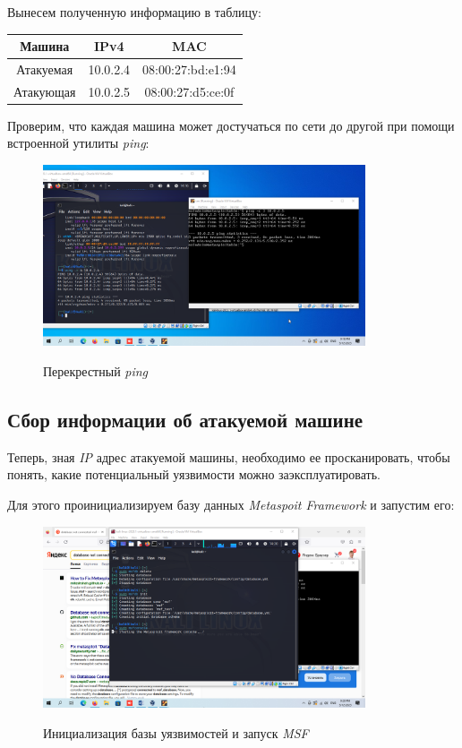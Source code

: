 \documentclass[a4paper]{article}
\begin{document}
  Вынесем полученную информацию в таблицу:
  \begin{table}[H]
    \centering
    \begin{tabular}{|c|c|c|}
        \hline
        Машина & IPv4 & MAC \\
        \hline
        Атакуемая & 10.0.2.4 & 08:00:27:bd:e1:94 \\
        \hline
        Атакующая & 10.0.2.5 & 08:00:27:d5:ce:0f \\
        \hline
    \end{tabular}
  \end{table}

  Проверим, что каждая машина может достучаться по сети до другой при помощи встроенной
  утилиты \textit{ping}:

  \begin{figure}[H]
    \centering
    \includegraphics[width=0.85\textwidth]{04_0037}
    \label{img:37}
    \caption{Перекрестный \textit{ping}}
  \end{figure}

  \subsection{Сбор информации об атакуемой машине}

  Теперь, зная \textit{IP} адрес атакуемой машины, необходимо ее просканировать,
  чтобы понять, какие потенциальный уязвимости можно заэксплуатировать.

  Для этого проинициализируем базу данных \textit{Metaspoit Framework} и запустим его: 

  \begin{figure}[H]
    \centering
    \includegraphics[width=0.85\textwidth]{04_0043}
    \label{img:43}
    \caption{Инициализация базы уязвимостей и запуск \textit{MSF}}
  \end{figure}
\end{document}
